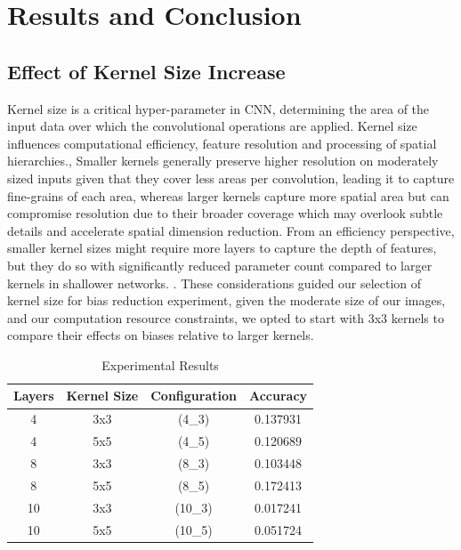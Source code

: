\documentclass[conference]{IEEEtran}
\begin{document}
\section{Results and Conclusion}
\subsection{Effect of Kernel Size Increase}
Kernel size is a critical hyper-parameter in CNN, determining the area of the input data over which the convolutional operations are applied. Kernel size influences computational efficiency, feature resolution and processing of spatial hierarchies.\cite{simonyan2014very}, Smaller kernels generally preserve higher resolution on moderately sized inputs given that they cover less areas per convolution, leading it to capture fine-grains of each area, whereas larger kernels capture more spatial area but can compromise resolution due to their broader coverage which may overlook subtle details and accelerate spatial dimension reduction. From an efficiency perspective, smaller kernel sizes might require more layers to capture the depth of features, but they do so with significantly reduced parameter count compared to larger kernels in shallower networks. \cite{simonyan2014very} . These considerations guided our selection of kernel size for bias reduction experiment, given the moderate size of our images, and our computation resource constraints, we opted to start with 3x3 kernels to compare their effects on biases  relative to larger kernels.
\begin{table}[!hb]
\renewcommand{\arraystretch}{1.3}
\caption{Experimental Results}
\label{tab:experimental_results}
\centering
\begin{tabular}{cccc}
\toprule
\textbf{Layers} & \textbf{Kernel Size} & \textbf{Configuration} & \textbf{Accuracy} \\
\midrule
4 & 3x3 & (4\_3) & 0.137931 \\
4 & 5x5 & (4\_5) & 0.120689 \\
8 & 3x3 & (8\_3) & 0.103448 \\
8 & 5x5 & (8\_5) & 0.172413 \\
10 & 3x3 & (10\_3) & 0.017241 \\
10 & 5x5 & (10\_5) & 0.051724 \\
\bottomrule
\end{tabular}
\end{table}
\end{document}
